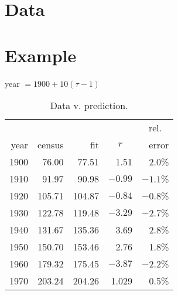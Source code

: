 \section{Data} %

\section{Example}  %
year $= 1900 + 10 (\tau - 1)$

    \begin{table}[t]
    	\caption{Data v. prediction.}
    	\begin{center}
    		\begin{tabular}{rrrrr}
		          &&&& \multicolumn{1}{c}{rel.}\\
    		 year & census & fit & \multicolumn{1}{c}{$r$} & error \\\hline
    		 1900 & 76.00  & 77.51  & 1.51  & 2.0\% \\
    		 1910 & 91.97  & 90.98  & $-0.99$ & $-1.1$\% \\
    		 1920 & 105.71 & 104.87 & $-0.84$ & $-0.8$\% \\
    		 1930 & 122.78 & 119.48 & $-3.29$ & $-2.7$\% \\
    		 1940 & 131.67 & 135.36 & 3.69  & 2.8\% \\
    		 1950 & 150.70 & 153.46 & 2.76  & 1.8\% \\
    		 1960 & 179.32 & 175.45 & $-3.87$ & $-2.2$\% \\
    		 1970 & 203.24 & 204.26 & 1.029 & 0.5\% \\
    		\end{tabular}
    	\end{center}
    	\label{tab:census results}
    \end{table}%

